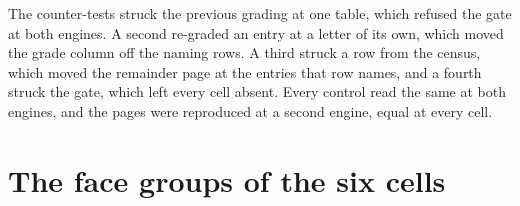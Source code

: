 \begin{chproof}[instrument]
The counter-tests struck the previous grading at one table, which refused the gate at both engines. A second re-graded an entry at a letter of its own, which moved the grade column off the naming rows. A third struck a row from the census, which moved the remainder page at the entries that row names, and a fourth struck the gate, which left every cell absent. Every control read the same at both engines, and the pages were reproduced at a second engine, equal at every cell.
\end{chproof}

\section{The face groups of the six cells}\label{mod:IV-12-face-groups-of-the-six-cells}
\begin{chtable}

\end{chtable}
